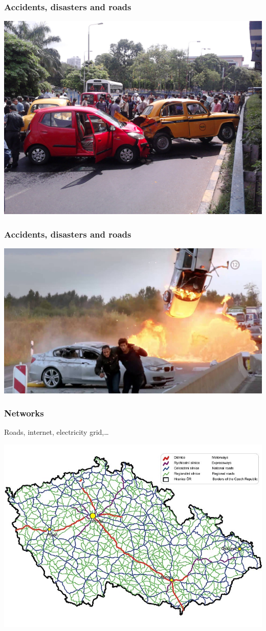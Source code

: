 \documentclass[10pt]{beamer}
\begin{document}
\begin{frame}
	\frametitle{Accidents, disasters and roads}
	\includegraphics[width=\textwidth]{images/accident.jpg}
\end{frame}

\begin{frame}
	\frametitle{Accidents, disasters and roads}
	\includegraphics[width=\textwidth]{images/kobra_11.jpg}
\end{frame}

\begin{frame}
	\frametitle{Networks}
	Roads, internet, electricity grid,\ldots

	\includegraphics[width=\textwidth]{images/road_network.jpg}
\end{frame}
\end{document}
